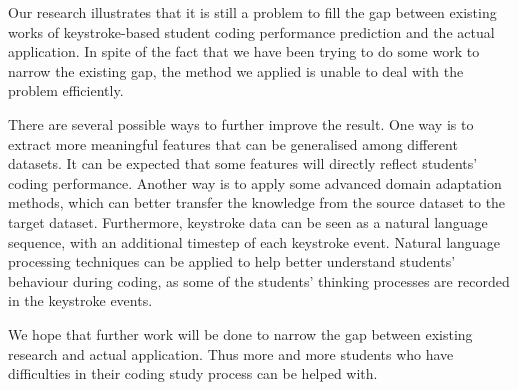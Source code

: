 \documentclass[sigconf,final]{acmart}
\begin{document}
Our research illustrates that it is still a problem to fill the gap between existing works of keystroke-based student coding performance prediction and the actual application. In spite of the fact that we have been trying to do some work to narrow the existing gap, the method we applied is unable to deal with the problem efficiently. 

There are several possible ways to further improve the result. One way is to extract more meaningful features that can be generalised among different datasets. It can be expected that some features will directly reflect students' coding performance. Another way is to apply some advanced domain adaptation methods, which can better transfer the knowledge from the source dataset to the target dataset. Furthermore, keystroke data can be seen as a natural language sequence, with an additional timestep of each keystroke event. Natural language processing techniques can be applied to help better understand students' behaviour during coding, as some of the students' thinking processes are recorded in the keystroke events. 

We hope that further work will be done to narrow the gap between existing research and actual application. Thus more and more students who have difficulties in their coding study process can be helped with.
\end{document}
